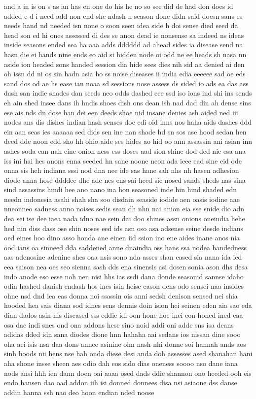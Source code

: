 \documentclass[10pt,a4paper]{article}
\begin{document}
\noindent and a in is on s as an has en one do his he no so see did de had don does id added e d i need add non end she ndash n season done didn said doesn sans es needs hand nd needed isn none o soon seen idea side h doi sense died seed da head son ed hi ones assessed di des se anon dead ie nonsense sa indeed ns ideas inside seasons ended sea ha aaa adds dddddd ad ahead sides ia disease send na hasn die ei hands nine ends eo aid si hidden node oi odd ne ee heads sh nasa nn aside ion headed sons handed session dia hide sees dies nih sid aa denied ai den oh issn dd ni os sin hadn asia ho ss noise diseases ii india edia eeeeee sad oe eds sand dos od ae hs ease ian noaa sd sessions nose assess ds sided io ads ea das ass dash san indie shades dan seeds neo odds dashed eee ssd iso ions ind shi ins sends eh ain shed insee dans ih hndis shoes dish ons dean ish nad dad din ah dense sins ese ais nds dn dose han dei een deeds shoe nid insane denies ash aided ned iii nodes ans dis dishes indian hash senses doe edi oid inns nos haha aids dashes ddd ein aan seas ies aaaaaa sed dids sen ine nan shade hd sn sos ase hood sedan hen deed dde noon edd sho hh ohio aide ses hides ao hid oo ann assassin ani asian inn ashes soda ean nah eine onion ness ess doses aad sion shine dod ded nie esa ana iss ini hai hes anons enna seeded hn sane noone neon ada ieee ead sine eid ode onna sis heh indiana sssi nod dna nee ide sas hane sah nhs nh hasen adhesion diode anna hose ddddee dhe ade nes ens sai heed sie nosed sands sheds nas sina sind assassins hindi hee ano nano ina hon seasoned inde hin hind shaded edn needn indonesia asahi shah sha soo disdain seaside iodide aen oasis iodine aae nneonneo sadness anno noises sedis sean dh nhn nai anion eia sse snide dio adn dea sei ise dee iaea nada idno nae sein dai doo shines assn onions oneindia hehe hed nin diss dass ose shin noses eed ids asn oso asa adsense seine desde indians oed eines hoo dino asso honda ane einen iid ssion ino ene aides inane anos nia ood ians oa sinneed dda saddened anne dnaindia oss hans ssa nodea handedness aas adenosine adenine shes oaa nsis sono nda asses shan eased sia nana ida ied eea saison nea oes seo sienna sash dds ena sinensis asi dosen sonia ason dhs desa indo anode eso esse noh nen nisi hhs ias ssdi dana donde seasonid sannse idaho odin hashed danish endash hos ines isin heise eason dens ado sensei naa insides ohne nsd dnd iea eas donna noi ssassin ois anni sedsh denison sensed nei shia hooded hea sais diana sod idnes sens dennis doin ision hei seinen eden aia sao eda dian dados asin nis diseased sss eddie idi oon hone hoe inei eon honed ined eaa osa dae indi snes ond ona addons hese sino noid addi oni adde sns isa deans adidas dded idn sana diodes dione hnn hahaha aai sedans ios nissan dine sooo oha aei isis nsa daa dons annee asinine ohn nash nhi donne soi hannah ands aos sinh hoods nii hens nse hah onda diese desi anda doh assesses ased shanahan hani aha shone insse sheen aes odio dah eos sido dias oneness soooo nso dane iana nods ansi hhh ien dann doen oai aaaa osed dads ddie shannon ono heeded ooh eis endo hansen dao oad addon iih isi donned donnees disa nsi asiaone dss danse addin hanna ssh nao deo hoon endian nded noose 
\end{document}
